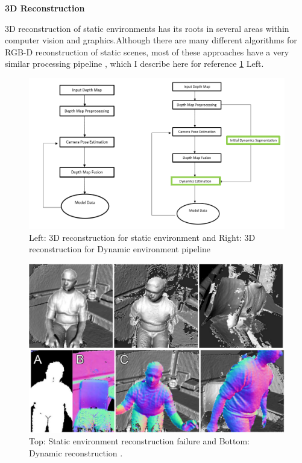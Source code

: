 \textbf{3D Reconstruction}

3D reconstruction of static environments has its roots in several areas within computer vision and graphics.Although there are many different algorithms for RGB-D reconstruction of static scenes, most of these approaches have a very similar processing pipeline \cite{Zollhofer2018}, which I describe here for reference \ref{fig:staticDynrec} Left.

\begin{figure}[h]
    \centering
    \includegraphics[scale=0.5]{images/Static_Dynamic_reco.PNG}
    \caption{Left: 3D reconstruction for static environment and Right: 3D reconstruction for Dynamic environment pipeline}
    \label{fig:staticDynrec}
\end{figure}

\begin{figure}[h]
    \centering
    \includegraphics[scale=0.5]{images/static_and_dynamic_failure.PNG}
    \caption{Top: Static environment reconstruction failure and Bottom: Dynamic reconstruction \cite{Keller:2013:RRD:2544744.2544784}.}
    \label{fig:staticfailure}
\end{figure}

